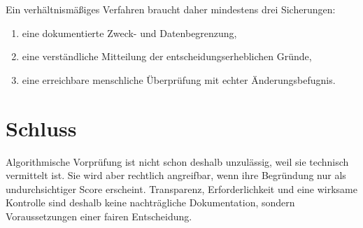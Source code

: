 \documentclass[utf8,ngerman,automatter,texgyre,centerpagenumber]{hausarbeit-jura}
\begin{document}
Ein verhältnismäßiges Verfahren braucht daher mindestens drei Sicherungen:
\begin{enumerate}
  \item eine dokumentierte Zweck- und Datenbegrenzung,
  \item eine verständliche Mitteilung der entscheidungserheblichen Gründe,
  \item eine erreichbare menschliche Überprüfung mit echter
        Änderungsbefugnis.
\end{enumerate}

\chapter*{Schluss}
Algorithmische Vorprüfung ist nicht schon deshalb unzulässig, weil sie
technisch vermittelt ist. Sie wird aber rechtlich angreifbar, wenn ihre
Begründung nur als undurchsichtiger Score erscheint. Transparenz,
Erforderlichkeit und eine wirksame Kontrolle sind deshalb keine nachträgliche
Dokumentation, sondern Voraussetzungen einer fairen Entscheidung.
\end{document}
